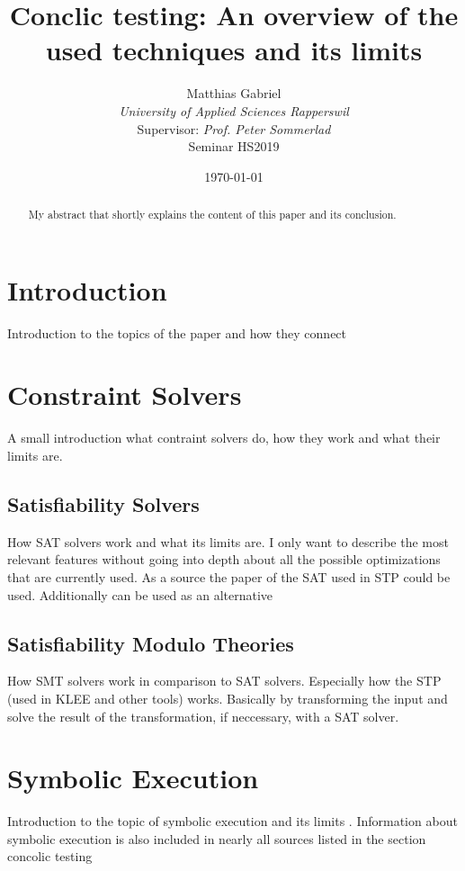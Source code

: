 \documentclass[journal]{IEEEtran}
\begin{document}
\title{Conclic testing: An overview of the used techniques and its limits}
\author{Matthias Gabriel\\\textit{University of Applied Sciences Rapperswil}\\[1cm]{\small Supervisor: \textit{Prof. Peter Sommerlad}\\Seminar HS2019}}
\date{\today}
\maketitle

\begin{abstract}
My abstract that shortly explains the content of this paper and its conclusion.
\end{abstract}

\section{Introduction}
Introduction to the topics of the paper and how they connect
\section{Constraint Solvers}
A small introduction what contraint solvers do, how they work and what their limits are.
\subsection{Satisfiability Solvers}
How SAT solvers work and what its limits are.
I only want to describe the most relevant features without going into depth about all the possible optimizations that are currently used.
As a source the paper of the SAT used in STP \cite{10.1007/978-3-540-24605-3_37} could be used. Additionally \cite{Gomes2008SatisfiabilityS} can be used as an alternative
\subsection{Satisfiability Modulo Theories}
How SMT solvers work in comparison to SAT solvers.
Especially how the STP \cite{Ganesh:2007:DPB:1770351.1770421} (used in KLEE and other tools) works.
Basically by transforming the input and solve the result of the transformation, if neccessary, with a SAT solver.
\section{Symbolic Execution}
Introduction to the topic of symbolic execution and its limits \cite{SurveySymExec-CSUR18} . Information about symbolic execution is also included in nearly all sources listed in the section concolic testing
\end{document}
